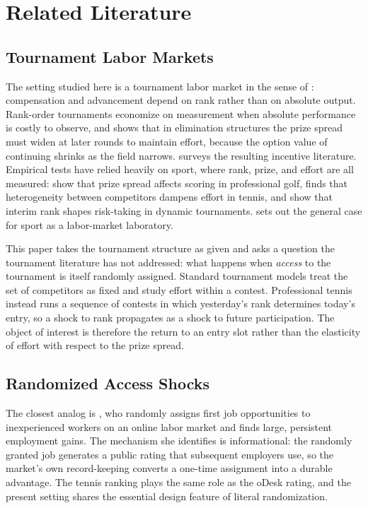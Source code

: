 \section{Related Literature}
\label{sec:literature}

\subsection{Tournament Labor Markets}
\label{sec:lit_tournaments}

The setting studied here is a tournament labor market in the sense of \citet{Lazear1981_tournaments}: compensation and advancement depend on rank rather than on absolute output. Rank-order tournaments economize on measurement when absolute performance is costly to observe, and \citet{Rosen1986_elimination_tournaments} shows that in elimination structures the prize spread must widen at later rounds to maintain effort, because the option value of continuing shrinks as the field narrows. \citet{Prendergast1999_incentives_firms} surveys the resulting incentive literature. Empirical tests have relied heavily on sport, where rank, prize, and effort are all measured: \citet{Ehrenberg1990_tournaments_golf} show that prize spread affects scoring in professional golf, \citet{Sunde2009_heterogeneity_tennis} finds that heterogeneity between competitors dampens effort in tennis, and \citet{Genakos2012_interim_rank} show that interim rank shapes risk-taking in dynamic tournaments. \citet{Kahn2000_sports_laboratory} sets out the general case for sport as a labor-market laboratory.

This paper takes the tournament structure as given and asks a question the tournament literature has not addressed: what happens when \textit{access} to the tournament is itself randomly assigned. Standard tournament models treat the set of competitors as fixed and study effort within a contest. Professional tennis instead runs a sequence of contests in which yesterday's rank determines today's entry, so a shock to rank propagates as a shock to future participation. The object of interest is therefore the return to an entry slot rather than the elasticity of effort with respect to the prize spread.

\subsection{Randomized Access Shocks}
\label{sec:lit_access}

The closest analog is \citet{Pallais2014_inefficient_hiring}, who randomly assigns first job opportunities to inexperienced workers on an online labor market and finds large, persistent employment gains. The mechanism she identifies is informational: the randomly granted job generates a public rating that subsequent employers use, so the market's own record-keeping converts a one-time assignment into a durable advantage. The tennis ranking plays the same role as the oDesk rating, and the present setting shares the essential design feature of literal randomization.


